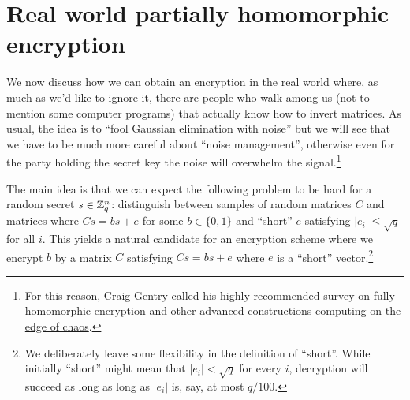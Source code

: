 \hypertarget{privkeyfhe}{}

\section{Real world partially homomorphic
encryption}\label{17-Real-world-partially-h}

We now discuss how we can obtain an encryption in the real world where,
as much as we'd like to ignore it, there are people who walk among us
(not to mention some computer programs) that actually know how to invert
matrices. As usual, the idea is to ``fool Gaussian elimination with
noise'' but we will see that we have to be much more careful about
``noise management'', otherwise even for the party holding the secret
key the noise will overwhelm the signal.\footnote{For this reason, Craig
  Gentry called his highly recommended survey on fully homomorphic
  encryption and other advanced constructions
  \href{https://eprint.iacr.org/2014/610}{computing on the edge of
  chaos}.}

The main idea is that we can expect the following problem to be hard for
a random secret \(s\in{\mathbb{Z}}_q^n\): distinguish between samples of random
matrices \(C\) and matrices where \(Cs = bs + e\) for some
\(b\in\{0,1\}\) and ``short'' \(e\) satisfying \(|e_i| \leq \sqrt{q}\)
for all \(i\). This yields a natural candidate for an encryption scheme
where we encrypt \(b\) by a matrix \(C\) satisfying \(Cs = bs + e\)
where \(e\) is a ``short'' vector.\footnote{We deliberately leave some
  flexibility in the definition of ``short''. While initially ``short''
  might mean that \(|e_i|<\sqrt{q}\) for every \(i\), decryption will
  succeed as long as long as \(|e_i|\) is, say, at most \(q/100\).}

